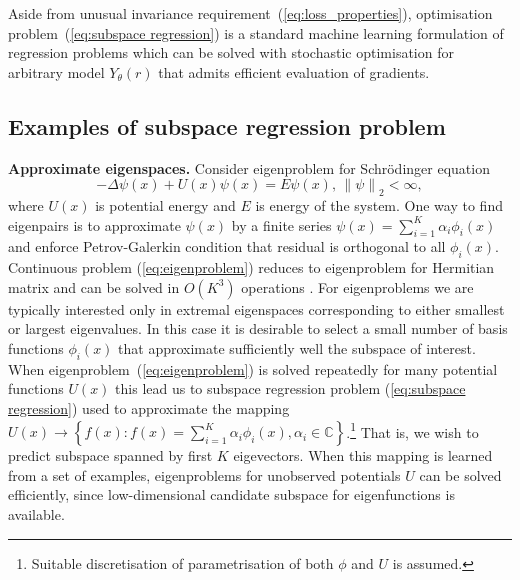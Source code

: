 \documentclass{article}
\begin{document}
Aside from unusual invariance requirement~(\ref{eq:loss_properties}), optimisation problem~(\ref{eq:subspace regression}) is a standard machine learning formulation of regression problems which can be solved with stochastic optimisation for arbitrary model $Y_{\theta}(r)$ that admits efficient evaluation of gradients.

\subsection{Examples of subspace regression problem}
\textbf{Approximate eigenspaces.} 
Consider eigenproblem for Schr\"{o}dinger equation
\begin{equation}
	\label{eq:eigenproblem}
	-\Delta \psi(x) + U(x)\psi(x) = E \psi(x),\,\left\|\psi\right\|_2 < \infty,
\end{equation}
where $U(x)$ is potential energy and $E$ is energy of the system. One way to find eigenpairs is to approximate $\psi(x)$ by a finite series $\psi(x) = \sum_{i=1}^{K}\alpha_i\phi_i(x)$ and enforce Petrov-Galerkin condition that residual is orthogonal to all $\phi_i(x)$. Continuous problem (\ref{eq:eigenproblem}) reduces to eigenproblem for Hermitian matrix and can be solved in $O\left(K^3\right)$ operations \cite{trefethen2022numerical}. For eigenproblems we are typically interested only in extremal eigenspaces corresponding to either smallest or largest eigenvalues. In this case it is desirable to select a small number of basis functions $\phi_i(x)$ that approximate sufficiently well the subspace of interest. When eigenproblem~(\ref{eq:eigenproblem}) is solved repeatedly for many potential functions $U(x)$ this lead us to subspace regression problem (\ref{eq:subspace regression}) used to approximate the mapping $U(x) \rightarrow \left\{ f(x): f(x)=\sum_{i=1}^{K}\alpha_i\phi_i(x), \alpha_i \in \mathbb{C}\right\}$.\footnote{Suitable discretisation of parametrisation of both $\phi$ and $U$ is assumed.} That is, we wish to predict subspace spanned by first $K$ eigevectors. When this mapping is learned from a set of examples, eigenproblems for unobserved potentials $U$ can be solved efficiently, since low-dimensional candidate subspace for eigenfunctions is available.
\end{document}
